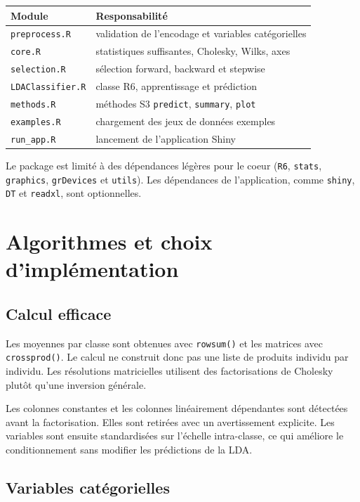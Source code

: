 \documentclass[11pt,a4paper]{article}
\begin{document}
\begin{center}
\begin{tabular}{ll}
\toprule
\textbf{Module} & \textbf{Responsabilité} \\
\midrule
\texttt{preprocess.R} & validation de l'encodage et variables catégorielles \\
\texttt{core.R} & statistiques suffisantes, Cholesky, Wilks, axes \\
\texttt{selection.R} & sélection forward, backward et stepwise \\
\texttt{LDAClassifier.R} & classe R6, apprentissage et prédiction \\
\texttt{methods.R} & méthodes S3 \texttt{predict}, \texttt{summary}, \texttt{plot} \\
\texttt{examples.R} & chargement des jeux de données exemples \\
\texttt{run\_app.R} & lancement de l'application Shiny \\
\bottomrule
\end{tabular}
\end{center}

Le package est limité à des dépendances légères pour le coeur
(\texttt{R6}, \texttt{stats}, \texttt{graphics}, \texttt{grDevices} et
\texttt{utils}). Les dépendances de l'application, comme \texttt{shiny},
\texttt{DT} et \texttt{readxl}, sont optionnelles.

\section{Algorithmes et choix d'implémentation}

\subsection{Calcul efficace}

Les moyennes par classe sont obtenues avec \texttt{rowsum()} et les matrices
avec \texttt{crossprod()}. Le calcul ne construit donc pas une liste de
produits individu par individu. Les résolutions matricielles utilisent des
factorisations de Cholesky plutôt qu'une inversion générale.

Les colonnes constantes et les colonnes linéairement dépendantes sont
détectées avant la factorisation. Elles sont retirées avec un avertissement
explicite. Les variables sont ensuite standardisées sur l'échelle intra-classe,
ce qui améliore le conditionnement sans modifier les prédictions de la LDA.

\subsection{Variables catégorielles}
\end{document}
